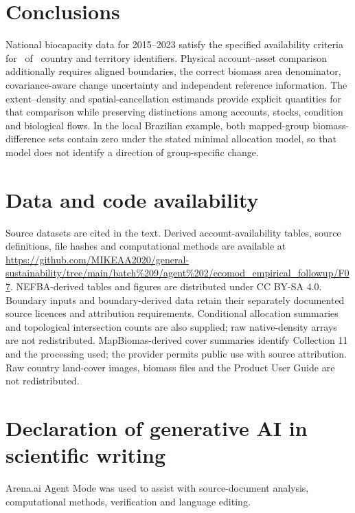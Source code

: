 \documentclass[11pt,a4paper]{article}
\begin{document}
\section{Conclusions}
National biocapacity data for 2015--2023 satisfy the specified availability criteria for \AccountPass\ of \CountryIDs\ country and territory identifiers. Physical account--asset comparison additionally requires aligned boundaries, the correct biomass area denominator, covariance-aware change uncertainty and independent reference information. The extent--density and spatial-cancellation estimands provide explicit quantities for that comparison while preserving distinctions among accounts, stocks, condition and biological flows. In the local Brazilian example, both mapped-group biomass-difference sets contain zero under the stated minimal allocation model, so that model does not identify a direction of group-specific change.

\section*{Data and code availability}
Source datasets are cited in the text. Derived account-availability tables, source definitions, file hashes and computational methods are available at \url{https://github.com/MIKEAA2020/general-sustainability/tree/main/batch%209/agent%202/ecomod_empirical_followup/F07}. NEFBA-derived tables and figures are distributed under CC BY-SA 4.0. Boundary inputs and boundary-derived data retain their separately documented source licences and attribution requirements. Conditional allocation summaries and topological intersection counts are also supplied; raw native-density arrays are not redistributed. MapBiomas-derived cover summaries identify Collection 11 and the processing used; the provider permits public use with source attribution. Raw country land-cover images, biomass files and the Product User Guide are not redistributed.

\section*{Declaration of generative AI in scientific writing}
Arena.ai Agent Mode was used to assist with source-document analysis, computational methods, verification and language editing.
\end{document}
